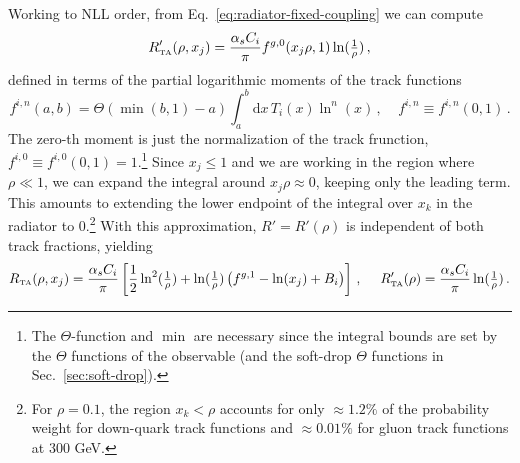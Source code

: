 \documentclass[letterpaper,11pt]{article}
\newcommand{\Sec}[1]{Sec.~\ref{#1}}
\newcommand{\Eq}[1]{Eq.~\eqref{#1}}
\begin{document}
Working to NLL order, from \Eq{eq:radiator-fixed-coupling} we can compute
\begin{equation}
\label{eq:R-prime}
R_{\mbox{\tiny TA}}'(\rho,x_j) = \frac{\alpha_sC_i}{\pi} f^{g,0}(x_j\rho,1)\ln(\tfrac{1}{\rho}) \,,
\end{equation}
defined in terms of the partial logarithmic moments of the track functions
\begin{equation}
\label{eq:partial-log-moment}
f^{i,n}(a,b) = \Theta(\min(b,1)-a) \int_a^b \text{d}x\,T_i(x)\ln^n(x) \,, \ \ \ \ \ f^{i,n} \equiv f^{i,n}(0,1)\,.
\end{equation}
The zero-th moment is just the normalization of the track frunction, $f^{i,0} \equiv f^{i,0}(0,1) = 1$.\footnote{The $\Theta$-function and $\min$ are necessary since the integral bounds are set by the $\Theta$ functions of the observable (and the soft-drop $\Theta$ functions in \Sec{sec:soft-drop}).}
%
Since $x_j \le 1$ and we are working in the region where $\rho \ll 1$, we can expand the integral around $x_j\rho \approx 0$, keeping only the leading term. 
%
This amounts to extending the lower endpoint of the integral over $x_k$ in the radiator to 0.\footnote{For $\rho = 0.1$, the region $x_k < \rho$ accounts for only $\approx 1.2\%$ of the probability weight for down-quark track functions and $\approx 0.01\%$ for gluon track functions at 300 GeV. } 
%
With this approximation, $R' = R'(\rho)$ is independent of both track fractions, yielding
\begin{equation}
\label{eq:approx-fixed-coupling-NLL-radiator}
R_{\mbox{\tiny TA}}(\rho,x_j) = \frac{\alpha_sC_i}{\pi} \left[ \frac{1}{2}\ln^2(\tfrac{1}{\rho}) + \ln(\tfrac{1}{\rho})\left(f^{g,1} - \ln(x_j) + B_i\right)\right]\, ,\ \ \ \ R_{\mbox{\tiny TA}}'(\rho) = \frac{\alpha_sC_i}{\pi}\ln(\tfrac{1}{\rho})\,.
\end{equation}
\end{document}
